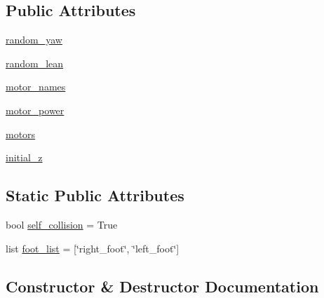 \subsection*{Public Attributes}
\begin{DoxyCompactItemize}
\item 
\hyperlink{classpybullet-gym_1_1pybulletgym_1_1envs_1_1mujoco_1_1robots_1_1locomotors_1_1humanoid_1_1_humanoid_a7bce1af1393e965d200d6770a3da069a}{random\+\_\+yaw}
\item 
\hyperlink{classpybullet-gym_1_1pybulletgym_1_1envs_1_1mujoco_1_1robots_1_1locomotors_1_1humanoid_1_1_humanoid_ae3fdbd6db63b3694bdb6a155d0d29726}{random\+\_\+lean}
\item 
\hyperlink{classpybullet-gym_1_1pybulletgym_1_1envs_1_1mujoco_1_1robots_1_1locomotors_1_1humanoid_1_1_humanoid_adaef8b421676d50b2eb844b5027c733c}{motor\+\_\+names}
\item 
\hyperlink{classpybullet-gym_1_1pybulletgym_1_1envs_1_1mujoco_1_1robots_1_1locomotors_1_1humanoid_1_1_humanoid_ac6949ce46fef05c0dbfc48cc24900b99}{motor\+\_\+power}
\item 
\hyperlink{classpybullet-gym_1_1pybulletgym_1_1envs_1_1mujoco_1_1robots_1_1locomotors_1_1humanoid_1_1_humanoid_abfa67cc70d7eb3b29d61dfb8b93351a2}{motors}
\item 
\hyperlink{classpybullet-gym_1_1pybulletgym_1_1envs_1_1mujoco_1_1robots_1_1locomotors_1_1humanoid_1_1_humanoid_aee60763c9fa0bdb57ce44c77d711bdde}{initial\+\_\+z}
\end{DoxyCompactItemize}
\subsection*{Static Public Attributes}
\begin{DoxyCompactItemize}
\item 
bool \hyperlink{classpybullet-gym_1_1pybulletgym_1_1envs_1_1mujoco_1_1robots_1_1locomotors_1_1humanoid_1_1_humanoid_a788555aad5835f26da435d3cf99929ce}{self\+\_\+collision} = True
\item 
list \hyperlink{classpybullet-gym_1_1pybulletgym_1_1envs_1_1mujoco_1_1robots_1_1locomotors_1_1humanoid_1_1_humanoid_acba1e89b83817bdd8677bbf6eae80594}{foot\+\_\+list} = \mbox{[}\char`\"{}right\+\_\+foot\char`\"{}, \char`\"{}left\+\_\+foot\char`\"{}\mbox{]}
\end{DoxyCompactItemize}


\subsection{Constructor \& Destructor Documentation}
